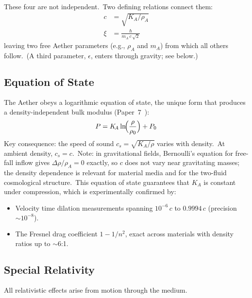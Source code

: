 ﻿\documentclass[12pt,letterpaper]{article}
\newcommand{\rhoa}{\rho_{\!A}}
\newcommand{\Ka}{K_{\!A}}
\begin{document}
These four are not independent.\ Two defining relations connect them:
%
\begin{align}
  c &= \sqrt{\Ka / \rhoa}
    \label{eq:sum-speed-of-light} \\
  \xi &= \frac{\hbar}{m_A\,c\,\sqrt{2}}
    \label{eq:sum-healing-length}
\end{align}
%
leaving two free Aether parameters (e.g., $\rhoa$ and $m_A$) from which all
others follow.\ (A third parameter, $\epsilon$, enters through gravity; see below.)


\subsection{Equation of State}

The Aether obeys a logarithmic equation of state, the unique form that produces
a density-independent bulk modulus (Paper~7~\cite{otto-quantum}):
%
\begin{equation}
  P = \Ka \ln\!\Bigl(\frac{\rho}{\rho_0}\Bigr) + P_0
  \label{eq:sum-eos}
\end{equation}
%
Key consequence: the speed of sound $c_s = \sqrt{\Ka/\rho}$ varies with
density.\ At ambient density, $c_s = c$.\ Note: in gravitational fields,
Bernoulli's equation for free-fall inflow gives $\Delta\rho/\rhoa = 0$
exactly, so $c$ does not vary near gravitating masses; the density
dependence is relevant for material media and for the two-fluid
cosmological structure.\ This equation of state guarantees that $\Ka$ is
constant under compression, which is experimentally confirmed by:
%
\begin{itemize}[leftmargin=2em]
  \item Velocity time dilation measurements spanning $10^{-6}\,c$ to $0.9994\,c$
    (precision $\sim 10^{-8}$).
  \item The Fresnel drag coefficient $1 - 1/n^2$, exact across materials with
    density ratios up to $\sim$6:1.
\end{itemize}


\subsection{Special Relativity}

All relativistic effects arise from motion through the medium.
\end{document}

